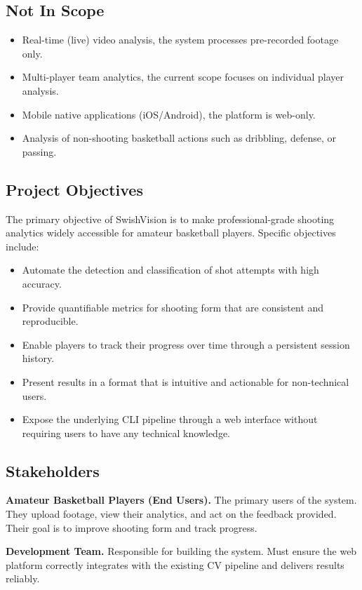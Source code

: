 ﻿\documentclass[11pt,a4paper]{article}
\begin{document}
\subsection{Not In Scope}
\begin{itemize}[leftmargin=*]
    \item Real-time (live) video analysis, the system processes pre-recorded footage only.
    \item Multi-player team analytics, the current scope focuses on individual player analysis.
    \item Mobile native applications (iOS/Android), the platform is web-only.
    \item Analysis of non-shooting basketball actions such as dribbling, defense, or passing.
\end{itemize}

\subsection{Project Objectives}
The primary objective of SwishVision is to make professional-grade shooting analytics widely accessible for amateur basketball players. Specific objectives include:
\begin{itemize}[leftmargin=*]
    \item Automate the detection and classification of shot attempts with high accuracy.
    \item Provide quantifiable metrics for shooting form that are consistent and reproducible.
    \item Enable players to track their progress over time through a persistent session history.
    \item Present results in a format that is intuitive and actionable for non-technical users.
    \item Expose the underlying CLI pipeline through a web interface without requiring users to have any technical knowledge.
\end{itemize}

\subsection{Stakeholders}
\textbf{Amateur Basketball Players (End Users).} The primary users of the system. They upload footage, view their analytics, and act on the feedback provided. Their goal is to improve shooting form and track progress.

\textbf{Development Team.} Responsible for building the system. Must ensure the web platform correctly integrates with the existing CV pipeline and delivers results reliably.
\end{document}
